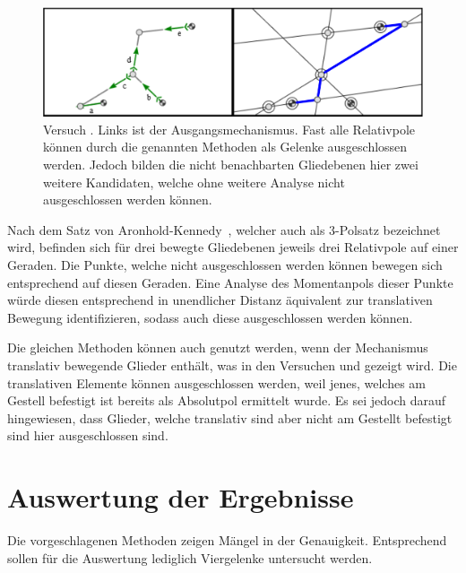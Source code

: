 \begin{figure}
    \includegraphics[width=\textwidth]{gfx/gruppe4_3_edit.png}
    \caption[Versuch ]{Versuch . Links ist der Ausgangsmechanismus. Fast alle Relativpole können durch die genannten Methoden als Gelenke ausgeschlossen werden. Jedoch bilden die nicht benachbarten Gliedebenen hier zwei weitere Kandidaten, welche ohne weitere Analyse nicht ausgeschlossen werden können.}
    \label{fig:gruppe4_3}
\end{figure}

Nach dem Satz von Aronhold-Kennedy~\cite{Goessner2016, Kerle2016}, welcher auch als 3-Polsatz bezeichnet wird, befinden sich für drei bewegte Gliedebenen jeweils drei Relativpole auf einer Geraden.
Die Punkte, welche nicht ausgeschlossen werden können bewegen sich entsprechend auf diesen Geraden.
Eine Analyse des Momentanpols dieser Punkte würde diesen entsprechend in unendlicher Distanz äquivalent zur translativen Bewegung identifizieren, sodass auch diese ausgeschlossen werden können.

Die gleichen Methoden können auch genutzt werden, wenn der Mechanismus translativ bewegende Glieder enthält, was in den Versuchen  und  gezeigt wird.
Die translativen Elemente können ausgeschlossen werden, weil jenes, welches am Gestell befestigt ist bereits als Absolutpol ermittelt wurde.
Es sei jedoch darauf hingewiesen, dass Glieder, welche translativ sind aber nicht am Gestellt befestigt sind hier ausgeschlossen sind.

\section{Auswertung der Ergebnisse}

Die vorgeschlagenen Methoden zeigen Mängel in der Genauigkeit.
Entsprechend sollen für die Auswertung lediglich Viergelenke untersucht werden.

